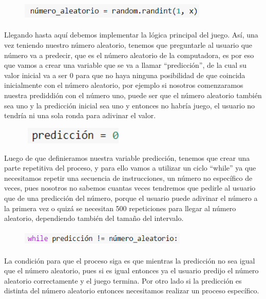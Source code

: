 \documentclass[a4paper,12pt]{article}
\begin{document}
\begin{figure}[H]
    \caption{}
    \centering \includegraphics[width=9cm, height=1cm]{nua.png}
    \label{fig1:my_label}
\end{figure}

\large{Llegando hasta aquí debemos implementar la lógica principal del juego. Así, una vez teniendo nuestro número aleatorio, tenemos que preguntarle al usuario que número va a predecir, que es el número aleatorio de la computadora, es por eso que vamos a crear una variable que se va a llamar ``predicción'', de la cual su valor inicial va a ser 0 para que no haya ninguna posibilidad de que coincida inicialmente con el número aleatorio, por ejemplo si nosotros comenzaramos nuestra prediddión con el número uno, puede ser que el número aleatorio también sea uno y la predicción inicial sea uno y entonces no habría juego, el usuario no tendría ni una sola ronda para adivinar el valor.}

\begin{figure}[H]
    \caption{}
    \centering \includegraphics[width=5cm, height=0.8cm]{pre.png}
    \label{fig1:my_label}
\end{figure}

\large{Luego de que definieramos nuestra variable predicción, tenemos que crear una parte repetitiva del proceso, y para ello vamos a utilizar un ciclo ``while'' ya que necesitamos repetir una secuencia de instrucciones, un número no específico de veces, pues nosotros no sabemos cuantas veces tendremos que pedirle al usuario que de una predicción del número, porque el usuario puede adivinar el número a la primera vez o quizá se necesitan 500 repeticiones para llegar al número aleatorio, dependiendo también del tamaño del intervalo.} 

\begin{figure}[H]
    \caption{}
    \centering \includegraphics[width=8cm, height=0.8cm]{wh.png}
    \label{fig1:my_label}
\end{figure}

\large{La condición para que el proceso siga es que mientras la predicción no sea igual que el número aleatorio, pues si es igual entonces ya el usuario predijo el número aleatorio correctamente y el juego termina. Por otro lado si la predicción es distinta del número aleatorio entonces necesitamos realizar un proceso específico.}
\end{document}
